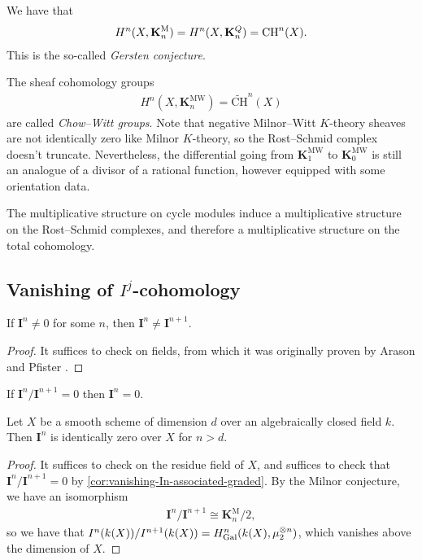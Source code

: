 \documentclass[11pt,openany]{book}
\providecommand{\KM}{\mathbf{K}^\mathrm{M}}
\providecommand{\KMW}{\mathbf{K}^\mathrm{MW}}
\providecommand{\CHW}{\widetilde{\mathrm{CH}}}
\begin{document}
\begin{corollary}\label{cor:gersten_conj} We have that
\begin{align*}
    H^n(X,\KM_n) = H^n(X, \mathbf{K}^Q_n) = \CH^n(X).
\end{align*}
This is the so-called \textit{Gersten conjecture}.
\end{corollary}


\begin{definition} The sheaf cohomology groups
\begin{align*}
    H^n(X, \KMW_n) = \CHW^n(X)
\end{align*}
are called \textit{Chow--Witt groups}. Note that negative Milnor--Witt $K$-theory sheaves are not identically zero like Milnor $K$-theory, so the Rost--Schmid complex doesn't truncate. Nevertheless, the differential going from $\KMW_1$ to $\KMW_0$ is still an analogue of a divisor of a rational function, however equipped with some orientation data.
\end{definition}

\begin{remark} The multiplicative structure on cycle modules induce a multiplicative structure on the Rost--Schmid complexes, and therefore a multiplicative structure on the total cohomology.
\end{remark}




\subsection{Vanishing of $I^j$-cohomology}

\begin{proposition} If $\mathbf{I}^n \ne 0$ for some $n$, then $\mathbf{I}^n \ne \mathbf{I}^{n+1}$.
\end{proposition}
\begin{proof} It suffices to check on fields, from which it was originally proven by Arason and Pfister \cite[Korollar~2]{ArasonPfister}.
\end{proof}

\begin{corollary}\label{cor:vanishing-In-associated-graded} 
If $\mathbf{I}^n / \mathbf{I}^{n+1} = 0$ then $\mathbf{I}^n = 0$.
\end{corollary}




\begin{theorem} Let $X$ be a smooth scheme of dimension $d$ over an algebraically closed field $k$. Then $\mathbf{I}^{n}$ is identically zero over $X$ for $n>d$.
\end{theorem}
\begin{proof} It suffices to check on the residue field of $X$, and suffices to check that $\mathbf{I}^n/\mathbf{I}^{n+1} = 0$ by \autoref{cor:vanishing-In-associated-graded}. By the Milnor conjecture, we have an isomorphism
\begin{align*}
    \mathbf{I}^n/\mathbf{I}^{n+1} \cong \KM_n/2,
\end{align*}
so we have that $I^n(k(X))/I^{n+1}(k(X)) = H^n_{\mathrm{Gal}}(k(X), \mu_2^{\otimes n})$, which vanishes above the dimension of $X$. 
\end{proof}
\end{document}

